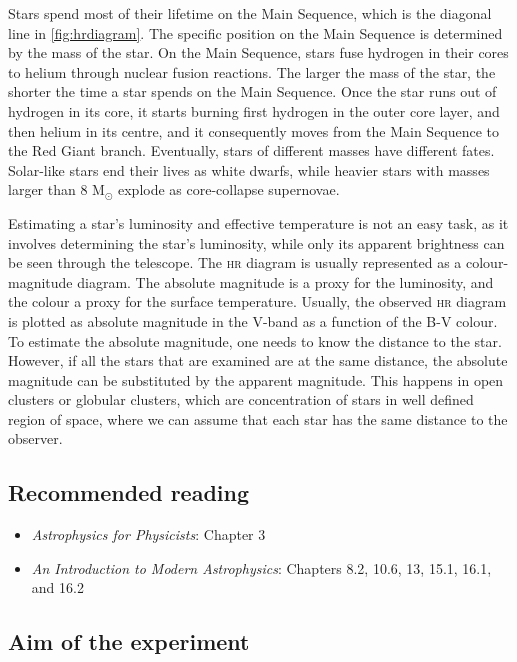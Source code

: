\documentclass[a4paper, 11pt, fleqn]{memoir}
\begin{document}
Stars spend most of their lifetime on the Main Sequence, which is the diagonal line in \cref{fig:hrdiagram}.
The specific position on the Main Sequence is determined by the mass of the star.
On the Main Sequence, stars fuse hydrogen in their cores to helium through nuclear fusion reactions.
The larger the mass of the star, the shorter the time a star spends on the Main Sequence.
Once the star runs out of hydrogen in its core, it starts burning first hydrogen in the outer core layer, and then helium in its centre, and it consequently moves from the Main Sequence to the Red Giant branch.
Eventually, stars of different masses have different fates.
Solar-like stars end their lives as white dwarfs, while heavier stars with masses larger than 8 M$_{\odot}$
explode as core-collapse supernovae.

Estimating a star's luminosity and effective temperature is not an easy task, as it involves determining the star's luminosity, while only its apparent brightness can be seen through the telescope.
The \textsc{hr} diagram is usually represented as a colour-magnitude diagram.
The absolute magnitude is a proxy for the luminosity, and the colour a proxy for the surface temperature.
Usually, the observed \textsc{hr} diagram is plotted as absolute magnitude in the V-band as a function of the B-V colour.
To estimate the absolute magnitude, one needs to know the distance to the star.
However, if all the stars that are examined are at the same distance, the absolute magnitude can be substituted by the apparent magnitude.
This happens in open clusters or globular clusters, which are concentration of stars in well defined region of space, where we can assume that each star has the same distance to the observer.

\subsection{Recommended reading}

\begin{itemize}
    \item \emph{Astrophysics for Physicists}\autocite{Choudhuri}: Chapter 3 
    \item \emph{An Introduction to Modern Astrophysics}\autocite{carroll2017introduction}: Chapters 8.2, 10.6, 13, 15.1, 16.1, and 16.2
\end{itemize}


\subsection{Aim of the experiment}
\end{document}
